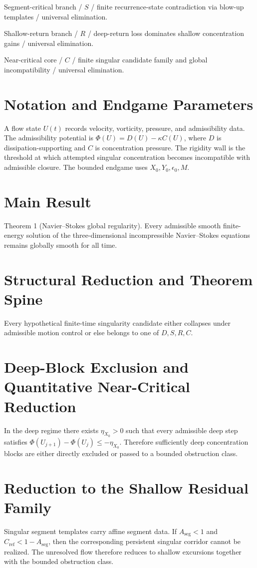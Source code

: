 \documentclass[11pt]{article}
\theoremstyle{definition}
\begin{document}
Segment-critical branch / $S$ / finite recurrence-state contradiction via blow-up templates / universal elimination.

Shallow-return branch / $R$ / deep-return loss dominates shallow concentration gains / universal elimination.

Near-critical core / $C$ / finite singular candidate family and global incompatibility / universal elimination.
\section{Notation and Endgame Parameters}
A flow state $U(t)$ records velocity, vorticity, pressure, and admissibility data. The admissibility potential is $\Phi(U)=D(U)-\kappa C(U)$, where $D$ is dissipation-supporting and $C$ is concentration pressure. The rigidity wall is the threshold at which attempted singular concentration becomes incompatible with admissible closure. The bounded endgame uses $X_0,Y_0,\epsilon_0,M$.
\section{Main Result}
Theorem 1 (Navier--Stokes global regularity). Every admissible smooth finite-energy solution of the three-dimensional incompressible Navier--Stokes equations remains globally smooth for all time.
\section{Structural Reduction and Theorem Spine}
Every hypothetical finite-time singularity candidate either collapses under admissible motion control or else belongs to one of $D,S,R,C$.
\section{Deep-Block Exclusion and Quantitative Near-Critical Reduction}
In the deep regime there exists $\eta_{X_0}>0$ such that every admissible deep step satisfies $\Phi(U_{j+1})-\Phi(U_j)\le -\eta_{X_0}$. Therefore sufficiently deep concentration blocks are either directly excluded or passed to a bounded obstruction class.
\section{Reduction to the Shallow Residual Family}
Singular segment templates carry affine segment data. If $A_{\mathrm{seg}}<1$ and $C_{\mathrm{ref}}<1-A_{\mathrm{seg}}$, then the corresponding persistent singular corridor cannot be realized. The unresolved flow therefore reduces to shallow excursions together with the bounded obstruction class.
\end{document}
